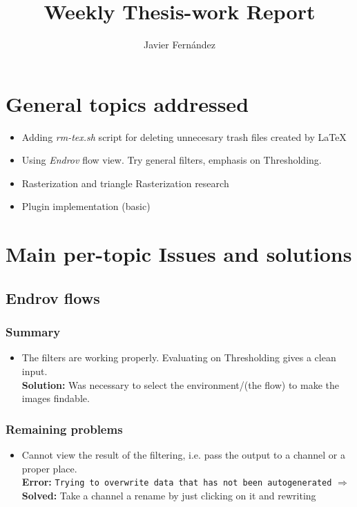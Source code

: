 \documentclass{article}
\title{Weekly Thesis-work Report}
\author{Javier Fern\'andez}
\begin{document}
\maketitle

\section{General topics addressed}
\begin{itemize}
\item Adding \emph{rm-tex.sh} script for deleting unnecesary trash files 
  created by \LaTeX
\item Using \emph{Endrov} flow view. Try general filters, emphasis on Thresholding.
\item Rasterization and triangle Rasterization research
\item Plugin implementation (basic)

\end{itemize}


\section{Main per-topic Issues and solutions}
\subsection{Endrov flows}

\subsubsection*{Summary}

\begin{itemize}
\item The filters are working properly. Evaluating on Thresholding gives
      a clean input. \\
      \textbf{Solution: } Was necessary to select the
      environment/(the flow) to make the images findable.
\end{itemize}

\subsubsection*{Remaining problems}
\begin{itemize}
\item Cannot view the result of the filtering, i.e. pass the output
      to a channel or a proper place.\\
      \textbf{Error: } \texttt{Trying to overwrite data that has not been 
        autogenerated} $\Rightarrow$ \textbf{Solved: } Take a channel 
      a rename by just clicking on it and rewriting 
\end{itemize}
\end{document}
